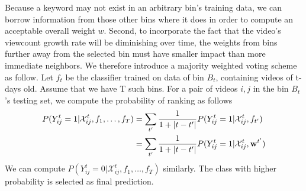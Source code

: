 	Because a keyword may not exist in an arbitrary bin's training data, we can borrow information from those other bins where it does in order to compute an acceptable overall weight $w$. Second, to incorporate the fact that the video's viewcount growth rate will be diminishing over time, the weights from bins further away from the selected bin must have smaller impact than more immediate neighbors. We therefore introduce a majority weighted voting scheme as follow. Let $f_t$ be the classifier trained on data of bin $B_t$, containing videos of t-days old. Assume that we have T such bins. For a pair of videos $i, j$ in the bin $B_t$'s testing set, we compute the probability of ranking as follows
		\begin{align}
			P(Y_{ij}^t = 1 | \mathcal{X}_{ij}^t, f_1, \ldots, f_T) &= \sum_{t'} \frac{1}{1+|t - t'|} P(Y_{ij}^t = 1 | \mathcal{X}_{ij}^t, f_{t'}) \\ \notag 
			&= \sum_{t'} \frac{1}{1+|t - t'|} P(Y_{ij}^t = 1 | \mathcal{X}_{ij}^t, \textbf{w}^{t'})
		\end{align}
		We can compute $P(Y_{ij}^t = 0 | \mathcal{X}_{ij}^t, f_1, \ldots, f_T)$ similarly. The class with higher probability is selected as final prediction.
